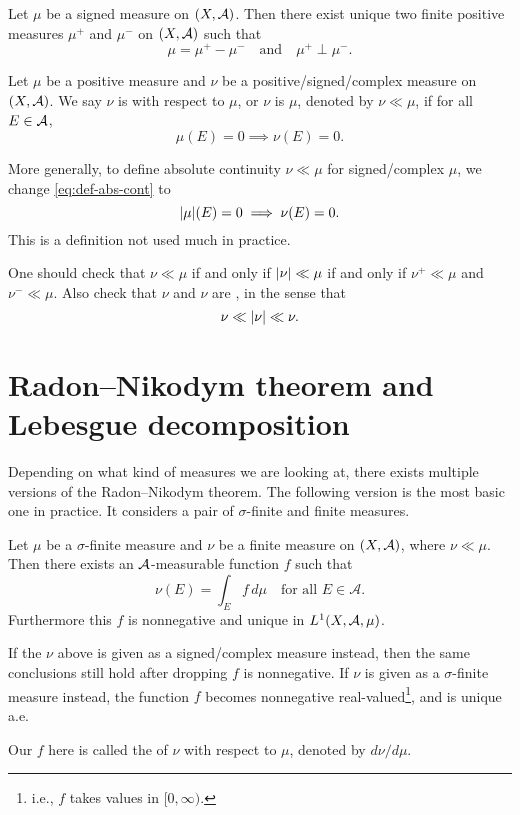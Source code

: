 \begin{namedthm}
    Let $\mu$ be a signed measure on $(X,\mathcal{A})$. Then there exist unique two finite positive measures $\mu^+$ and $\mu^-$ on $(X,\mathcal{A})$ such that \[
        \mu = \mu^+ - \mu^- \quad \text{and} \quad \mu^+ \perp \mu^-.
    \]
\end{namedthm}
\begin{defn} \label{def:abs-cont}
     Let $\mu$ be a positive measure and $\nu$ be a positive/signed/complex measure on $(X, \mathcal{A})$. We say $\nu$ is  with respect to $\mu$, or $\nu$ is  $\mu$, denoted by $\nu \ll \mu$, if for all $E\in \mathcal{A}$, \begin{equation} \label{eq:def-abs-cont}
         \mu(E) = 0 \implies \nu(E) = 0.
     \end{equation}
        
    More generally, to define absolute continuity $\nu \ll \mu$ for signed/complex $\mu$, we change \eqref{eq:def-abs-cont} to \begin{equation} \label{eq:def-abs-cont-sign-cplx}
        \lvert \mu \rvert(E) = 0 \implies \nu(E) = 0.
    \end{equation} This is a definition not used much in practice.
\end{defn}
One should check that $\nu \ll \mu$ if and only if $\lvert \nu \rvert \ll \mu$ if and only if $\nu^+ \ll \mu$ and $\nu^- \ll \mu$. Also check that $\nu$ and $\nu$ are , in the sense that \[
    \nu \ll \lvert \nu \rvert \ll \nu.
\]


\section{Radon--Nikodym theorem and Lebesgue decomposition}
Depending on what kind of measures we are looking at, there exists multiple versions of the Radon--Nikodym theorem. The following version is the most basic one in practice. It considers a pair of $\sigma$-finite and finite measures.
\begin{namedthm} \label{thm:Radon-Nikodym}
    Let $\mu$ be a $\sigma$-finite measure and $\nu$ be a finite measure on $(X,\mathcal{A})$, where $\nu \ll \mu$. Then there exists an $\mathcal{A}$-measurable function $f$ such that \[
        \nu(E) = \int_E f \,d\mu \quad \text{for all }E\in \mathcal{A}.
    \]
    Furthermore this $f$ is nonnegative and unique in $L^1(X,\mathcal{A},\mu)$.

    If the $\nu$ above is given as a signed/complex measure instead, then the same conclusions still hold after dropping $f$ is nonnegative. If $\nu$ is given as a $\sigma$-finite measure instead, the function $f$ becomes nonnegative real-valued\footnote{i.e., $f$ takes values in $[0,\infty)$.}, and is unique a.e.
\end{namedthm}
Our $f$ here is called the  of $\nu$ with respect to $\mu$, denoted by $d\nu/d\mu$.

